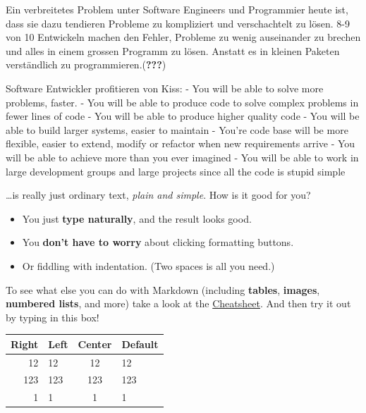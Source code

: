 Ein verbreitetes Problem unter Software Engineers und Programmier heute
ist, dass sie dazu tendieren Probleme zu kompliziert und verschachtelt
zu lösen. 8-9 von 10 Entwickeln machen den Fehler, Probleme zu wenig
auseinander zu brechen und alles in einem grossen Programm zu lösen.
Anstatt es in kleinen Paketen verständlich zu
programmieren.(\textbf{???})

Software Entwickler profitieren von Kiss: - You will be able to solve
more problems, faster. - You will be able to produce code to solve
complex problems in fewer lines of code - You will be able to produce
higher quality code - You will be able to build larger systems, easier
to maintain - You're code base will be more flexible, easier to extend,
modify or refactor when new requirements arrive - You will be able to
achieve more than you ever imagined - You will be able to work in large
development groups and large projects since all the code is stupid
simple

\newpage

\ldots{}is really just ordinary text, \emph{plain and simple}. How is it
good for you?

\begin{itemize}
\tightlist
\item
  You just \textbf{type naturally}, and the result looks good.
\item
  You \textbf{don't have to worry} about clicking formatting buttons.
\item
  Or fiddling with indentation. (Two spaces is all you need.)
\end{itemize}

To see what else you can do with Markdown (including \textbf{tables},
\textbf{images}, \textbf{numbered lists}, and more) take a look at the
\href{https://github.com/adam-p/markdown-here/wiki/Markdown-Here-Cheatsheet}{Cheatsheet}.
And then try it out by typing in this box!

\begin{longtable}[c]{@{}rlcl@{}}
\toprule
Right & Left & Center & Default\tabularnewline
\midrule
\endhead
12 & 12 & 12 & 12\tabularnewline
123 & 123 & 123 & 123\tabularnewline
1 & 1 & 1 & 1\tabularnewline
\bottomrule
\end{longtable}

